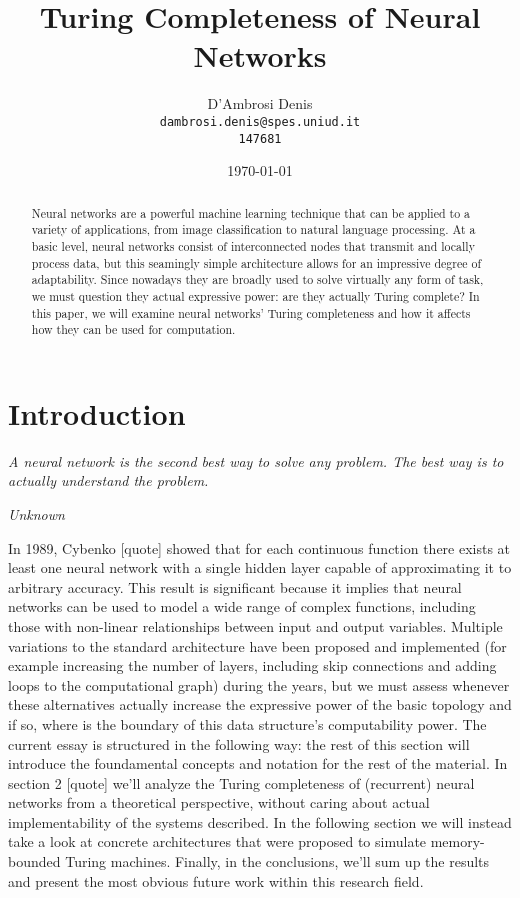 \documentclass{article}
\title{Turing Completeness of Neural Networks}
\author{D'Ambrosi Denis \\ \small \texttt{dambrosi.denis@spes.uniud.it} \\ \small \texttt{147681}}
\date{\today}
\begin{document}
\maketitle

\begin{abstract}
    Neural networks are a powerful machine learning technique that can be applied to a variety of applications, from image classification to natural language processing. At a basic level, neural networks consist of interconnected nodes that transmit and locally process data, but this seamingly simple architecture allows for an impressive degree of adaptability. Since nowadays they are broadly used to solve virtually any form of task, we must question they actual expressive power: are they actually Turing complete?
    In this paper, we will examine neural networks' Turing completeness and how it affects how they can be used for computation.
\end{abstract}

\section{Introduction}

\epigraph{\textit{A neural network is the second best way to solve any problem. The best way is to actually understand the problem.}}{\textit{Unknown}}

In 1989, Cybenko [quote] showed that for each continuous function there exists at least one neural network with a single hidden layer capable of approximating it to arbitrary accuracy. This result is significant because it implies that neural networks can be used to model a wide range of complex functions, including those with non-linear relationships between input and output variables. 
Multiple variations to the standard architecture have been proposed and implemented (for example increasing the number of layers, including skip connections and adding loops to the computational graph) during the years, but we must assess whenever these alternatives actually increase the expressive power of the basic topology and if so, where is the boundary of this data structure's computability power.
The current essay is structured in the following way: the rest of this section will introduce the foundamental concepts and notation for the rest of the material. In section 2 [quote] we'll analyze the Turing completeness of (recurrent) neural networks from a theoretical perspective, without caring about actual implementability of the systems described. In the following section we will instead take a look at concrete architectures that were proposed to simulate memory-bounded Turing machines. Finally, in the conclusions, we'll sum up the results and present the most obvious future work within this research field.
\end{document}
